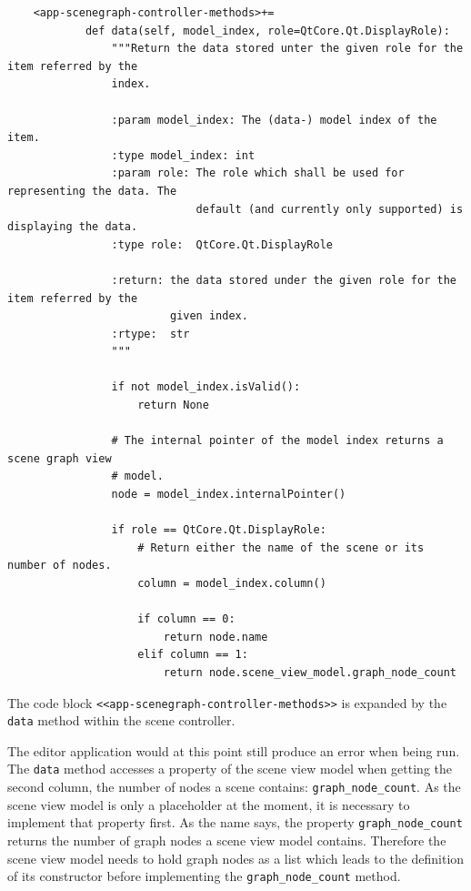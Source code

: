 \documentclass[10pt, openright, notitlepage]{scrreprt}
\begin{document}
\begin{listing}[H]
\begin{verbatim}
    <app-scenegraph-controller-methods>+=
            def data(self, model_index, role=QtCore.Qt.DisplayRole):
                """Return the data stored unter the given role for the item referred by the
                index.
            
                :param model_index: The (data-) model index of the item.
                :type model_index: int
                :param role: The role which shall be used for representing the data. The
                             default (and currently only supported) is displaying the data.
                :type role:  QtCore.Qt.DisplayRole
            
                :return: the data stored under the given role for the item referred by the
                         given index.
                :rtype:  str
                """
            
                if not model_index.isValid():
                    return None
            
                # The internal pointer of the model index returns a scene graph view
                # model.
                node = model_index.internalPointer()
            
                if role == QtCore.Qt.DisplayRole:
                    # Return either the name of the scene or its number of nodes.
                    column = model_index.column()
            
                    if column == 0:
                        return node.name
                    elif column == 1:
                        return node.scene_view_model.graph_node_count
\end{verbatim}
\caption{\label{lst:app-scenegraph-controller-methods-04}
The code block \texttt{<<app-scenegraph-controller-methods>>} is expanded by the \texttt{data} method within the scene controller.}
\end{listing}

The editor application would at this point still produce an error when being
run. The \texttt{data} method accesses a property of the scene view model
when getting the second column, the number of nodes a scene contains:
\texttt{graph\_node\_count}. As the scene view model is only a placeholder at the
moment, it is necessary to implement that property first. As the name says, the
property \texttt{graph\_node\_count} returns the number of graph nodes a scene view
model contains. Therefore the scene view model needs to hold graph nodes as a
list which leads to the definition of its constructor before implementing the
\texttt{graph\_node\_count} method.
\end{document}
